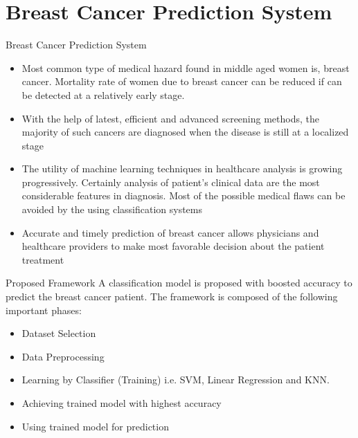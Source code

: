 \documentclass{SKP-beamer}
\begin{document}
\section{\textbf{Breast Cancer Prediction System}}

\begin{frame}{Breast Cancer Prediction System}
	\begin{itemize}
		\item Most common type of medical hazard found in middle aged women is, breast cancer. Mortality rate of women due
		to breast cancer can be reduced if can be detected at a relatively early stage.
		\item With the help of latest, efficient and
		advanced screening methods, the majority of such cancers are diagnosed when the disease is still at a localized stage
		\item The utility of machine learning techniques in healthcare analysis is growing progressively. Certainly analysis of patient’s clinical data are the most considerable features in diagnosis. Most of the possible medical flaws can be avoided by the using classification systems
		\item Accurate and timely prediction of breast cancer allows physicians and
		healthcare providers to make most favorable decision about the patient treatment
	\end{itemize}
\end{frame}

\begin{frame}{Proposed Framework}
	    A classification model is proposed with boosted accuracy to predict the breast cancer patient. The framework is composed of the following important phases:
		\begin{itemize}
		\item Dataset Selection
		\item Data Preprocessing
		\item Learning by Classifier (Training) i.e. SVM, Linear Regression and KNN.
		\item Achieving trained model with highest accuracy
		\item Using trained model for prediction
	\end{itemize}
\end{frame}
\end{document}
